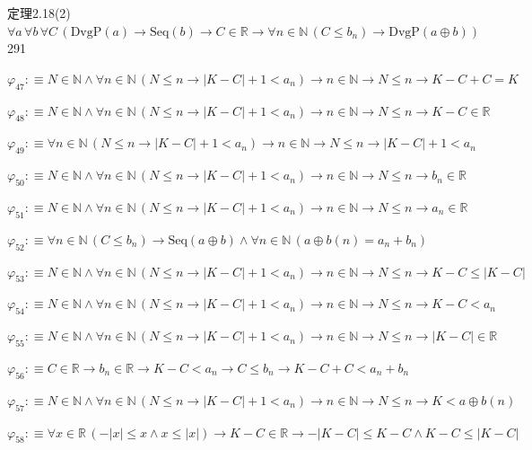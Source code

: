 \begin{fullproof}{定理2.18(2)}{$\forall a\,\forall b\,\forall C\,(\mathrm{DvgP}(a) \to \mathrm{Seq}(b) \to C \in \mathbb{R} \to \forall n \in \mathbb{N}\,(C \leq b_{n}) \to \mathrm{DvgP}(a \oplus b))$}{291}
\begin{abbrevlist}
\item $\varphi_{47} :\equiv N \in \mathbb{N} \land \forall n \in \mathbb{N}\,(N \leq n \to \lvert K - C \rvert + 1 < a_{n}) \to n \in \mathbb{N} \to N \leq n \to K - C + C = K$
\item $\varphi_{48} :\equiv N \in \mathbb{N} \land \forall n \in \mathbb{N}\,(N \leq n \to \lvert K - C \rvert + 1 < a_{n}) \to n \in \mathbb{N} \to N \leq n \to K - C \in \mathbb{R}$
\item $\varphi_{49} :\equiv \forall n \in \mathbb{N}\,(N \leq n \to \lvert K - C \rvert + 1 < a_{n}) \to n \in \mathbb{N} \to N \leq n \to \lvert K - C \rvert + 1 < a_{n}$
\item $\varphi_{50} :\equiv N \in \mathbb{N} \land \forall n \in \mathbb{N}\,(N \leq n \to \lvert K - C \rvert + 1 < a_{n}) \to n \in \mathbb{N} \to N \leq n \to b_{n} \in \mathbb{R}$
\item $\varphi_{51} :\equiv N \in \mathbb{N} \land \forall n \in \mathbb{N}\,(N \leq n \to \lvert K - C \rvert + 1 < a_{n}) \to n \in \mathbb{N} \to N \leq n \to a_{n} \in \mathbb{R}$
\item $\varphi_{52} :\equiv \forall n \in \mathbb{N}\,(C \leq b_{n}) \to \mathrm{Seq}(a \oplus b) \land \forall n \in \mathbb{N}\,(a \oplus b(n) = a_{n} + b_{n})$
\item $\varphi_{53} :\equiv N \in \mathbb{N} \land \forall n \in \mathbb{N}\,(N \leq n \to \lvert K - C \rvert + 1 < a_{n}) \to n \in \mathbb{N} \to N \leq n \to K - C \leq \lvert K - C \rvert$
\item $\varphi_{54} :\equiv N \in \mathbb{N} \land \forall n \in \mathbb{N}\,(N \leq n \to \lvert K - C \rvert + 1 < a_{n}) \to n \in \mathbb{N} \to N \leq n \to K - C < a_{n}$
\item $\varphi_{55} :\equiv N \in \mathbb{N} \land \forall n \in \mathbb{N}\,(N \leq n \to \lvert K - C \rvert + 1 < a_{n}) \to n \in \mathbb{N} \to N \leq n \to \lvert K - C \rvert \in \mathbb{R}$
\item $\varphi_{56} :\equiv C \in \mathbb{R} \to b_{n} \in \mathbb{R} \to K - C < a_{n} \to C \leq b_{n} \to K - C + C < a_{n} + b_{n}$
\item $\varphi_{57} :\equiv N \in \mathbb{N} \land \forall n \in \mathbb{N}\,(N \leq n \to \lvert K - C \rvert + 1 < a_{n}) \to n \in \mathbb{N} \to N \leq n \to K < a \oplus b(n)$
\item $\varphi_{58} :\equiv \forall x \in \mathbb{R}\,(-\lvert x \rvert \leq x \land x \leq \lvert x \rvert) \to K - C \in \mathbb{R} \to -\lvert K - C \rvert \leq K - C \land K - C \leq \lvert K - C \rvert$

\end{abbrevlist}
\end{fullproof}

